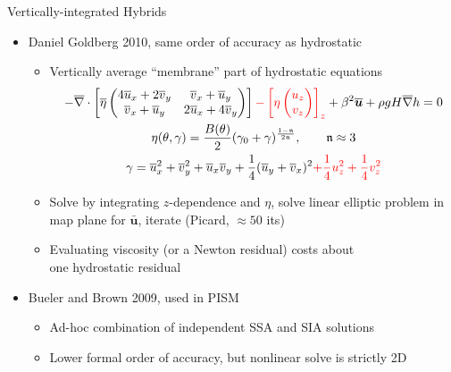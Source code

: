 \begin{frame}{Vertically-integrated Hybrids}
  \begin{itemize}
  \item Daniel Goldberg 2010, same order of accuracy as hydrostatic
    \begin{itemize}
    \item Vertically average ``membrane'' part of hydrostatic equations
      \begin{gather*}
        -\overline\nabla\cdot \left[\overline\eta
          \begin{pmatrix}
            4\overline u_x + 2\overline v_y & \overline v_x + \overline u_y   \\
            \overline v_x + \overline u_y   & 2\overline u_x + 4\overline v_y
          \end{pmatrix} \right]
        {\color{red} - \left[ \eta \begin{pmatrix} u_z \\ v_z \end{pmatrix} \right]_z}
        + \beta^2 \bm{\overline u} + \rho g H \overline{\nabla} h = 0 \\
        \eta(\theta,\gamma) = \frac{B(\theta)}{2} (\gamma_0 + \gamma)^{\frac{1-\mathfrak n}{2\mathfrak n}}, \qquad \mathfrak n \approx 3 \\
        \gamma = \overline u_x^2 + \overline v_y^2 + \overline u_x\overline v_y + \frac 1 4 (\overline u_y+\overline v_x)^2 {\color{red} + \frac 1 4 u_z^2 + \frac 1 4 v_z^2}
      \end{gather*}
    \item Solve by integrating $z$-dependence and $\eta$, solve linear elliptic problem in map plane for $\bm{\bar u}$, iterate (Picard, $\approx 50$ its)
    \item Evaluating viscosity (or a Newton residual) costs about \\ one hydrostatic residual
    \end{itemize}
  \item Bueler and Brown 2009, used in PISM
    \begin{itemize}
    \item Ad-hoc combination of independent SSA and SIA solutions
    \item Lower formal order of accuracy, but nonlinear solve is strictly 2D
    \end{itemize}
  \end{itemize}
\end{frame}
